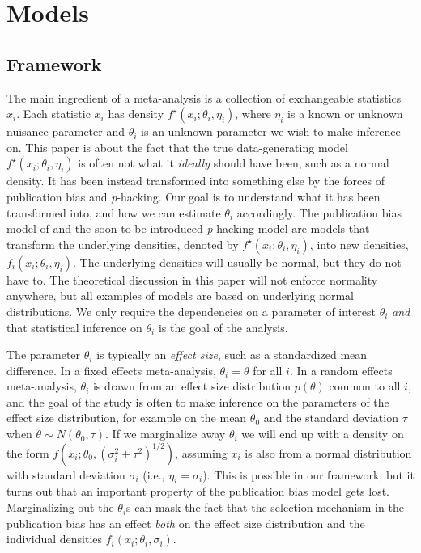 \documentclass{article}
\theoremstyle{plain}
\theoremstyle{definition}
\renewcommand{\sqrt}[1]{(#1)^{1/2}}
\begin{document}
\section{Models}\label{sect:models}

\subsection{Framework}
The main ingredient of a meta-analysis is a collection of exchangeable statistics $x_{i}$. Each statistic $x_{i}$ has density $f^{\star}\left(x_{i};\theta_{i},\eta_{i}\right)$, where $\eta_i$ is a known or unknown nuisance parameter and $\theta_{i}$ is an unknown parameter we wish to make inference on. This paper is about the fact that the true data-generating model $f^{\star}\left(x_{i};\theta_{i},\eta_{i}\right)$ is often not what it \emph{ideally} should have been, such as a normal density. It has been instead transformed into something else by the forces of publication bias and \textit{p}-hacking. Our goal is to understand what it has been transformed into, and how we can estimate $\theta_{i}$ accordingly. The publication bias model of \citet{hedges1992modeling,iyengar1988selection} and the soon-to-be introduced \textit{p}-hacking model are models that transform the underlying densities, denoted by $f^{\star}\left(x_{i};\theta_{i},\eta_{i}\right)$, into new densities, $f_{i}\left(x_{i};\theta_{i},\eta_{i}\right)$. The underlying densities will usually be normal, but they do not have to. The theoretical discussion in this paper will not enforce normality anywhere, but all examples of models are based on underlying normal distributions. We only require the dependencies on a parameter of interest $\theta_{i}$ \emph{and} that statistical inference on $\theta_{i}$ is the goal of the analysis.

The parameter $\theta_{i}$ is typically an \emph{effect size}, such as a standardized mean difference. In a fixed effects meta-analysis, $\theta_{i}=\theta$ for all $i$. In a random effects meta-analysis, $\theta_{i}$ is drawn from an effect size distribution $p\left(\theta\right)$ common to all $i$, and the goal of the study is often to make inference on the parameters of the effect size distribution, for example on the mean $\theta_{0}$ and the standard deviation $\tau$ when $\theta \sim N\left(\theta_{0},\tau\right)$. If we marginalize away $\theta_{i}$ we will end up with a density on the form $f(x_{i}; \theta_{0},\sqrt{\sigma_{i}^{2}+\tau^{2}})$, assuming $x_{i}$ is also from a normal distribution with standard deviation $\sigma_{i}$ (i.e., $\eta_i = \sigma_i$). This is possible in our framework, but it turns out that an important property of the publication bias model gets lost. Marginalizing out the $\theta_{i}$s can mask the fact that the selection mechanism in the publication bias has an effect \emph{both} on the effect size distribution and the individual densities $f_{i}\left(x_{i};\theta_i, \sigma_i\right)$.
\end{document}
